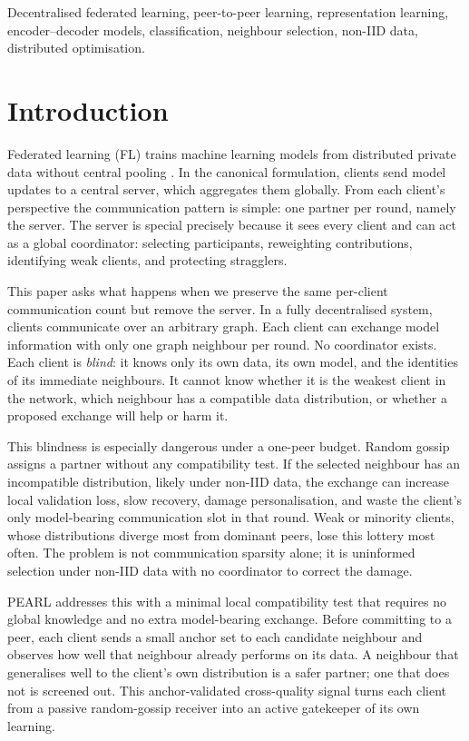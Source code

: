 \documentclass[conference]{IEEEtran}
\begin{document}
\begin{IEEEkeywords}
Decentralised federated learning, peer-to-peer learning, representation learning, encoder--decoder models, classification, neighbour selection, non-IID data, distributed optimisation.
\end{IEEEkeywords}

\section{Introduction}
\label{sec:introduction}
Federated learning (FL) trains machine learning models from distributed private data without central pooling \cite{mcmahan2017communication}. In the canonical formulation, clients send model updates to a central server, which aggregates them globally. From each client's perspective the communication pattern is simple: one partner per round, namely the server. The server is special precisely because it sees every client and can act as a global coordinator: selecting participants, reweighting contributions, identifying weak clients, and protecting stragglers.

This paper asks what happens when we preserve the same per-client communication count but remove the server. In a fully decentralised system, clients communicate over an arbitrary graph. Each client can exchange model information with only one graph neighbour per round. No coordinator exists. Each client is \emph{blind}: it knows only its own data, its own model, and the identities of its immediate neighbours. It cannot know whether it is the weakest client in the network, which neighbour has a compatible data distribution, or whether a proposed exchange will help or harm it.

This blindness is especially dangerous under a one-peer budget. Random gossip assigns a partner without any compatibility test. If the selected neighbour has an incompatible distribution, likely under non-IID data, the exchange can increase local validation loss, slow recovery, damage personalisation, and waste the client's only model-bearing communication slot in that round. Weak or minority clients, whose distributions diverge most from dominant peers, lose this lottery most often. The problem is not communication sparsity alone; it is uninformed selection under non-IID data with no coordinator to correct the damage.

PEARL addresses this with a minimal local compatibility test that requires no global knowledge and no extra model-bearing exchange. Before committing to a peer, each client sends a small anchor set to each candidate neighbour and observes how well that neighbour already performs on its data. A neighbour that generalises well to the client's own distribution is a safer partner; one that does not is screened out. This anchor-validated cross-quality signal turns each client from a passive random-gossip receiver into an active gatekeeper of its own learning.
\end{document}
